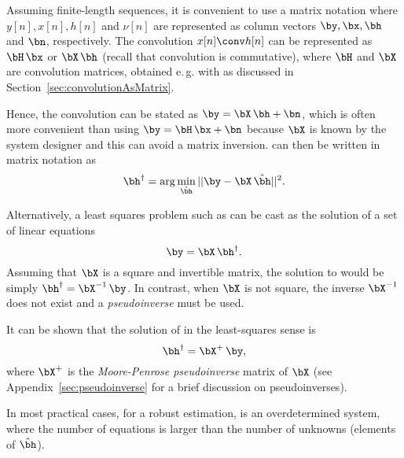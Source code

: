 Assuming finite-length sequences, it is convenient to use a matrix notation where $y[n],x[n],h[n]$ and $\nu[n]$ are represented as column vectors $\by,\bx,\bh$ and $\bn$, respectively.  The convolution $x[n] \conv h[n]$ can be represented as $\bH \, \bx$ or $\bX \, \bh$ (recall that convolution is commutative), where $\bH$ and $\bX$ are convolution matrices, obtained e.\,g. with  as discussed in Section~\ref{sec:convolutionAsMatrix}. 

Hence, the convolution can be stated as $\by = \bX \, \bh + \bn$, which is often more convenient than using $\by = \bH \, \bx + \bn$ because $\bX$ is known by the system designer and this can avoid a matrix inversion.
 can then be written in matrix notation as
\begin{equation}
{\bh}^\dag = \arg \min_{\hat \bh} ||\by - \bX \, \hat \bh||^2.
\label{eq:ls_problem}
\end{equation}

Alternatively, a least squares problem such as  can be cast as the
solution of a set of linear equations
\begin{equation}
\by = \bX \, \bh^\dag.
\label{eq:ls_problem_equationsSet}
\end{equation}
Assuming 
that $\bX$ is a square and invertible matrix, the solution to 
would be simply ${\bh}^\dag = {\bX}^{-1}  \, \by$. In contrast, when $\bX$ is not square, the inverse ${\bX}^{-1}$ does not exist and a \emph{pseudoinverse} must be used.

It can be shown that the solution of  in the least-squares sense is
\begin{equation}
{\bh}^\dag = \bX^{+} \,  \by,
\label{eq:ls_solution_general}
\end{equation}
where $\bX^+$ is the \emph{Moore-Penrose pseudoinverse} matrix of $\bX$ (see Appendix~\ref{sec:pseudoinverse} for a brief discussion on pseudoinverses).

In most practical cases, for a robust estimation,
 is an overdetermined system, where the number of equations is larger than the number of unknowns (elements of $\hat \bh$). 

